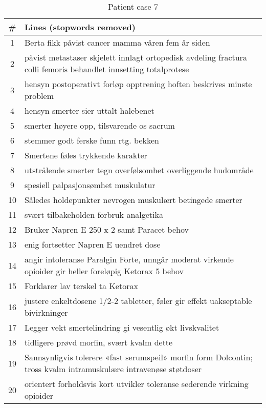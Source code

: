 \begin{table}[htbp] \footnotesize \center
\caption{Patient case 7\label{tab:case7}}
\begin{tabularx}{\textwidth}{c X}
    \toprule
    \# & Lines (stopwords removed) \\
    \midrule
    1 & Berta fikk påvist cancer mamma våren fem år siden \\
    2 & påvist metastaser skjelett innlagt ortopedisk avdeling fractura colli femoris behandlet innsetting totalprotese \\
    3 & hensyn postoperativt forløp opptrening hoften beskrives minste problem \\
    4 & hensyn smerter sier uttalt halebenet \\
    5 & smerter høyere opp, tilsvarende os sacrum \\
    6 & stemmer godt ferske funn rtg. bekken \\
    7 & Smertene føles trykkende karakter \\
    8 & utstrålende smerter tegn overfølsomhet overliggende hudområde \\
    9 & spesiell palpasjonsømhet muskulatur \\
    10 & Således holdepunkter nevrogen muskulært betingede smerter \\
    11 & svært tilbakeholden forbruk analgetika \\
    12 & Bruker Napren E 250 x 2 samt Paracet behov \\
    13 & enig fortsetter Napren E uendret dose \\
    14 & angir intoleranse Paralgin Forte, unngår moderat virkende opioider gir heller foreløpig Ketorax 5 behov \\
    15 & Forklarer lav terskel ta Ketorax \\
    16 & justere enkeltdosene 1/2-2 tabletter, føler gir effekt uakseptable bivirkninger \\
    17 & Legger vekt smertelindring gi vesentlig økt livskvalitet \\
    18 & tidligere prøvd morfin, svært kvalm dette \\
    19 & Sannsynligvis tolerere «fast serumspeil» morfin form Dolcontin; tross kvalm intramuskulære intravenøse støtdoser \\
    20 & orientert forholdsvis kort utvikler toleranse sederende virkning opioider \\
    \bottomrule
\end{tabularx}
\end{table}


